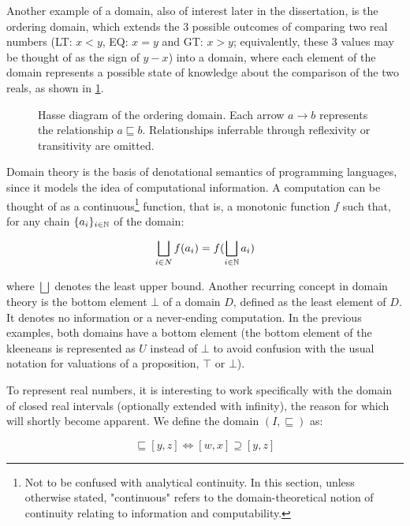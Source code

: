 Another example of a domain, also of interest later in the dissertation, is the ordering domain, which extends the 3 possible outcomes of comparing two real numbers (LT: $x < y$, EQ: $x = y$ and GT: $x > y$; equivalently, these 3 values may be thought of as the sign of $y-x$) into a domain, where each element of the domain represents a possible state of knowledge about the comparison of the two reals, as shown in \cref{fig:ordering_dom}.

\begin{figure}[h]
    \centering
    
    \caption{Hasse diagram of the ordering domain. Each arrow $a \rightarrow b$ represents the relationship $a \sqsubseteq b$. Relationships inferrable through reflexivity or transitivity are omitted.}
    \label{fig:ordering_dom}
\end{figure}

Domain theory is the basis of denotational semantics of programming languages, since it models the idea of computational information. A computation can be thought of as a continuous\footnote{Not to be confused with analytical continuity. In this section, unless otherwise stated, "continuous" refers to the domain-theoretical notion of continuity relating to information and computability.} function, that is, a monotonic function $f$ such that, for any chain $\{a_i\}_{i \in \mathbb{N}}$ of the domain:

\begin{equation*}
\bigsqcup_{\substack{i \in N}} f(a_i) = f(\bigsqcup_{\substack{i \in \mathbb{N}}} a_i)
\end{equation*}

where $\bigsqcup$ denotes the least upper bound. Another recurring concept in domain theory is the bottom element $\bot$ of a domain $D$, defined as the least element of $D$. It denotes no information or a never-ending computation. In the previous examples, both domains have a bottom element (the bottom element of the kleeneans is represented as $U$ instead of $\bot$ to avoid confusion with the usual notation for valuations of a proposition, $\top$ or $\bot$).

To represent real numbers, it is interesting to work specifically with the domain of closed real intervals (optionally extended with infinity), the reason for which will shortly become apparent. We define the domain $(I,\sqsubseteq)$ as:

\begin{equation*}
[w,x] \sqsubseteq [y,z] \iff [w,x] \supseteq [y,z]
\end{equation*}

